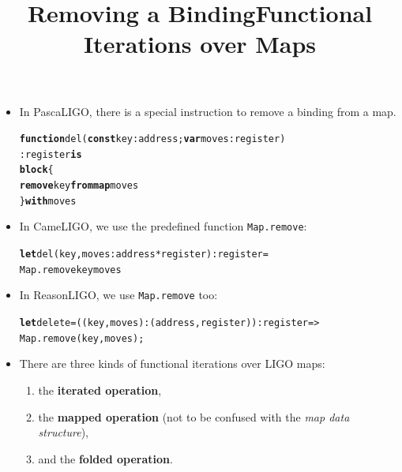 \documentclass[wide]{slides}
\newcommand{\Kblock}[0]{\textbf{block}\xspace}
\newcommand{\Kconst}[0]{\textbf{const}\xspace}
\newcommand{\Kfrom}[0]{\textbf{from}\xspace}
\newcommand{\Kfunction}[0]{\textbf{function}\xspace}
\newcommand{\Kis}[0]{\textbf{is}\xspace}
\newcommand{\Kmap}[0]{\textbf{map}\xspace}
\newcommand{\Kremove}[0]{\textbf{remove}\xspace}
\newcommand{\Kvar}[0]{\textbf{var}\xspace}
\newcommand{\Kwith}[0]{\textbf{with}\xspace}
\newcommand{\Klet}[0]{\textbf{let}\xspace}
\begin{document}
\begin{slide}
  \title{Removing a Binding}

  \begin{itemize}

    \item In PascaLIGO, there is a special instruction to remove a
      binding from a map.
   \begin{alltt}
\Kfunction del (\Kconst key : address; \Kvar moves : register)
 : register \Kis
  \Kblock \{
    \Kremove key \Kfrom \Kmap moves
  \} \Kwith moves
   \end{alltt}

   \item In CameLIGO, we use the predefined function
     \texttt{Map.remove}:
     \begin{alltt}
\Klet del (key, moves : address * register) : register =
  Map.remove key moves
     \end{alltt}

   \item In ReasonLIGO, we use \texttt{Map.remove} too:
     \begin{alltt}
\Klet delete = ((key, moves) : (address, register)) : register =>
  Map.remove (key, moves);
     \end{alltt}

  \end{itemize}

\end{slide}

\begin{slide}
  \title{Functional Iterations over Maps}

  \begin{itemize}

    \item There are three kinds of functional iterations over LIGO
      maps:
      \begin{enumerate}

        \item the \textbf{iterated operation},

        \item the \textbf{mapped operation} (not to be
          confused with the \emph{map data structure}),

        \item and the \textbf{folded operation}.

      \end{enumerate}

  \end{itemize}

\end{slide}
\end{document}
